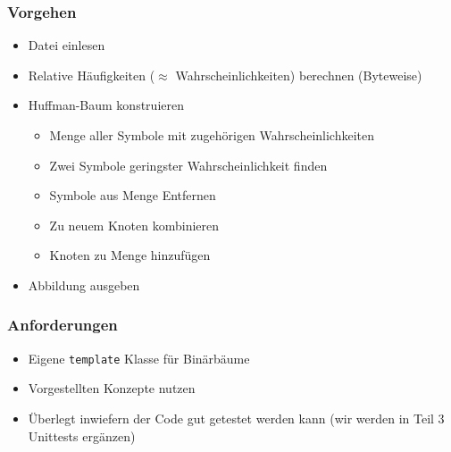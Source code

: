 \documentclass[aspectratio=169]{beamer}
\begin{document}
\begin{frame}
    \frametitle{Vorgehen}
    \begin{itemize}
        \item Datei einlesen
            \pause
        \item Relative Häufigkeiten ($\approx$ Wahrscheinlichkeiten) berechnen (Byteweise)
            \pause
        \item Huffman-Baum konstruieren
            \pause
            \begin{itemize}
                \item Menge aller Symbole mit zugehörigen Wahrscheinlichkeiten
                    \pause
                \item Zwei Symbole geringster Wahrscheinlichkeit finden
                    \pause
                \item Symbole aus Menge Entfernen
                    \pause
                \item Zu neuem Knoten kombinieren
                    \pause
                \item Knoten zu Menge hinzufügen
                    \pause
            \end{itemize}
        \item Abbildung ausgeben
    \end{itemize}
\end{frame}

\begin{frame}
    \frametitle{Anforderungen}
    \begin{itemize}
        \item Eigene \lstinline{template} Klasse für Binärbäume
            \pause
        \item Vorgestellten Konzepte nutzen
            \pause
        \item Überlegt inwiefern der Code gut getestet werden kann (wir werden in Teil 3 Unittests ergänzen)
    \end{itemize}
\end{frame}
\end{document}
